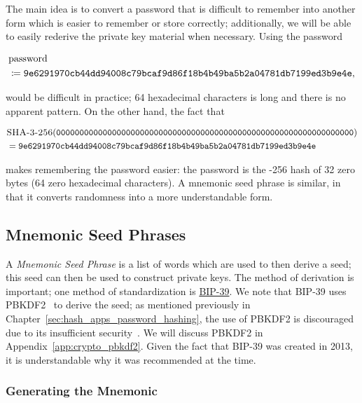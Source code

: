 The main idea is to convert a password that is difficult to remember
into another form which is easier to remember
or store correctly;
additionally, we will be able to easily rederive the private key material
when necessary.
Using the password

\begin{align}
    &\text{password} \nonumber\\
    &\coloneqq{}
    \texttt{9e6291970cb44dd94008c79bcaf9d86f18b4b49ba5b2a04781db7199ed3b9e4e},
\end{align}

\noindent
would be difficult in practice;
64 hexadecimal characters is long and there is no apparent pattern.
On the other hand, the fact that

\begin{align}
    &\textsc{\ShaThree{}-256}(
    \texttt{0000000000000000000000000000000000000000000000000000000000000000})
    \nonumber\\
    &= 
    \texttt{9e6291970cb44dd94008c79bcaf9d86f18b4b49ba5b2a04781db7199ed3b9e4e}
\end{align}

\noindent
makes remembering the password easier:
the password is the \textsc{\ShaThree{}-256} hash of 32 zero bytes
(64 zero hexadecimal characters).
A mnemonic seed phrase is similar, in that it converts
randomness into a more understandable form.

\subsection{Mnemonic Seed Phrases}

A \emph{Mnemonic Seed Phrase} is a list of words which are used to then
derive a seed;
this seed can then be used to construct private keys.
The method of derivation is important;
one method of standardization is
\href{https://github.com/bitcoin/bips/blob/master/bip-0039.mediawiki}{BIP-39}.
We note that BIP-39 uses PBKDF2~\cite{rfc8018} to derive the seed;
as mentioned previously in Chapter~\ref{sec:hash_apps_password_hashing},
the use of PBKDF2 is discouraged due to its insufficient
security~\cite{blocki2018economics}.
We will discuss PBKDF2 in Appendix~\ref{app:crypto_pbkdf2}.
Given the fact that BIP-39 was created in 2013, it is understandable
why it was recommended at the time.

\subsubsection{Generating the Mnemonic}

